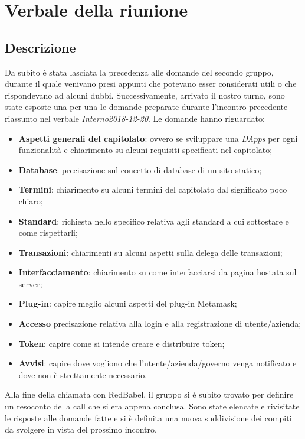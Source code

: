 \section{Verbale della riunione}

\subsection{Descrizione}
Da subito è stata lasciata la precedenza alle domande del secondo gruppo, durante il quale venivano presi appunti che potevano esser considerati utili o che rispondevano ad alcuni dubbi.\newline
Successivamente, arrivato il nostro turno, sono state esposte una per una le domande preparate durante l'incontro precedente riassunto nel verbale \textit{Interno2018-12-20}.\newline
Le domande hanno riguardato:
\begin{itemize}
	\item \textbf{Aspetti generali del capitolato}: ovvero se sviluppare una \textit{DApps} per ogni funzionalità e chiarimento su alcuni requisiti specificati nel capitolato;
	\item \textbf{Database}: precisazione sul concetto di database di un sito statico;
	\item \textbf{Termini}: chiarimento su alcuni termini del capitolato dal significato poco chiaro;
	\item \textbf{Standard}: richiesta nello specifico relativa agli standard a cui sottostare e come rispettarli;
	\item \textbf{Transazioni}: chiarimenti su alcuni aspetti sulla delega delle transazioni;
	\item \textbf{Interfacciamento}: chiarimento su come interfacciarsi da pagina hostata sul server;
	\item \textbf{Plug-in}: capire meglio alcuni aspetti del plug-in Metamask;
	\item \textbf{Accesso} precisazione relativa alla login e alla registrazione di utente/azienda;
	\item \textbf{Token}: capire come si intende creare e distribuire token;
	\item \textbf{Avvisi}: capire dove vogliono che l'utente/azienda/governo venga notificato e dove non è strettamente necessario.
\end{itemize}
Alla fine della chiamata con RedBabel, il gruppo si è subito trovato per definire un resoconto della call che si era appena conclusa. Sono state elencate e rivisitate le risposte alle domande fatte e si è definita una nuova suddivisione dei compiti da svolgere in vista del prossimo incontro.
